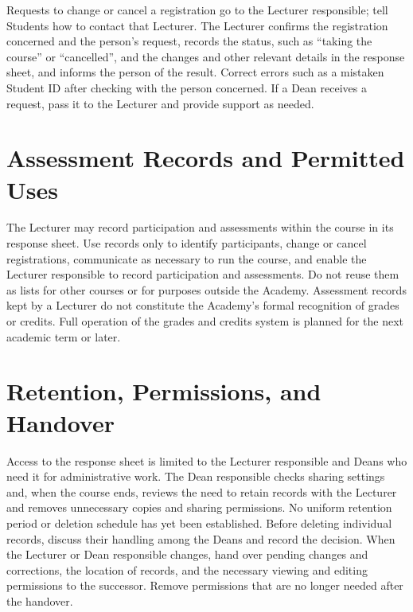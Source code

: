 Requests to change or cancel a registration go to the Lecturer responsible; tell Students how to contact that Lecturer. The Lecturer confirms the registration concerned and the person's request, records the status, such as ``taking the course'' or ``cancelled'', and the changes and other relevant details in the response sheet, and informs the person of the result.
Correct errors such as a mistaken Student ID after checking with the person concerned. If a Dean receives a request, pass it to the Lecturer and provide support as needed.

\section{Assessment Records and Permitted Uses}

The Lecturer may record participation and assessments within the course in its response sheet. Use records only to identify participants, change or cancel registrations, communicate as necessary to run the course, and enable the Lecturer responsible to record participation and assessments. Do not reuse them as lists for other courses or for purposes outside the Academy.
Assessment records kept by a Lecturer do not constitute the Academy's formal recognition of grades or credits. Full operation of the grades and credits system is planned for the next academic term or later.

\section{Retention, Permissions, and Handover}

Access to the response sheet is limited to the Lecturer responsible and Deans who need it for administrative work. The Dean responsible checks sharing settings and, when the course ends, reviews the need to retain records with the Lecturer and removes unnecessary copies and sharing permissions.
No uniform retention period or deletion schedule has yet been established. Before deleting individual records, discuss their handling among the Deans and record the decision.
When the Lecturer or Dean responsible changes, hand over pending changes and corrections, the location of records, and the necessary viewing and editing permissions to the successor. Remove permissions that are no longer needed after the handover.
